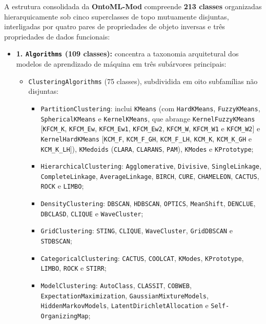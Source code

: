 \documentclass[11pt,a4paper]{article}
\newcommand{\onto}[1]{\texttt{\small #1}}
\begin{document}
{\sloppy
A estrutura consolidada da \textbf{OntoML-Mod} compreende \textbf{213 classes} organizadas hierarquicamente sob cinco superclasses de topo mutuamente disjuntas, interligadas por quatro pares de propriedades de objeto inversas e três propriedades de dados funcionais:

\begin{itemize}[leftmargin=*,nosep]
  \item \textbf{1. \onto{Algorithms} (109 classes):} concentra a taxonomia arquitetural dos modelos de aprendizado de máquina em três subárvores principais:
    \begin{itemize}[leftmargin=1.2em,nosep]
      \item \onto{ClusteringAlgorithms} (75 classes), subdividida em oito subfamílias não disjuntas:
        \begin{itemize}[leftmargin=1.2em,nosep]
          \item \onto{PartitionClustering}: inclui \onto{KMeans} (com \onto{HardKMeans}, \onto{FuzzyKMeans}, \onto{SphericalKMeans} e \onto{KernelKMeans}, que abrange \onto{KernelFuzzyKMeans} [\onto{KFCM\_K}, \onto{KFCM\_Ew}, \onto{KFCM\_Ew1}, \onto{KFCM\_Ew2}, \onto{KFCM\_W}, \onto{KFCM\_W1} e \onto{KFCM\_W2}] e \onto{KernelHardKMeans} [\onto{KCM\_F}, \onto{KCM\_F\_GH}, \onto{KCM\_F\_LH}, \onto{KCM\_K}, \onto{KCM\_K\_GH} e \onto{KCM\_K\_LH}]), \onto{KMedoids} (\onto{CLARA}, \onto{CLARANS}, \onto{PAM}), \onto{KModes} e \onto{KPrototype};
          \item \onto{HierarchicalClustering}: \onto{Agglomerative}, \onto{Divisive}, \onto{SingleLinkage}, \onto{CompleteLinkage}, \onto{AverageLinkage}, \onto{BIRCH}, \onto{CURE}, \onto{CHAMELEON}, \onto{CACTUS}, \onto{ROCK} e \onto{LIMBO};
          \item \onto{DensityClustering}: \onto{DBSCAN}, \onto{HDBSCAN}, \onto{OPTICS}, \onto{MeanShift}, \onto{DENCLUE}, \onto{DBCLASD}, \onto{CLIQUE} e \onto{WaveCluster};
          \item \onto{GridClustering}: \onto{STING}, \onto{CLIQUE}, \onto{WaveCluster}, \onto{GridDBSCAN} e \onto{STDBSCAN};
          \item \onto{CategoricalClustering}: \onto{CACTUS}, \onto{COOLCAT}, \onto{KModes}, \onto{KPrototype}, \onto{LIMBO}, \onto{ROCK} e \onto{STIRR};
          \item \onto{ModelClustering}: \onto{AutoClass}, \onto{CLASSIT}, \onto{COBWEB}, \onto{ExpectationMaximization}, \onto{GaussianMixtureModels}, \onto{HiddenMarkovModels}, \onto{LatentDirichletAllocation} e \onto{Self-OrganizingMap};

\end{itemize}
\end{itemize}
\end{itemize}}
\end{document}
